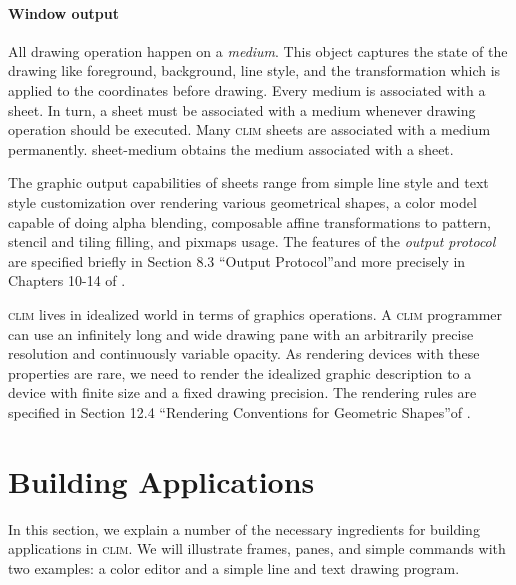 \documentclass[twocolumn,a4paper]{article}
\newcommand {\concept} [1] {{\sl #1}\index{#1}}
\newcommand {\code}[1]{{\sffamily #1}}
\newcommand {\CLIM}{\textsc{clim}}
\newcommand {\mcclim}{\textsc{McCLIM}}
\begin{document}
\paragraph*{Window output}

All drawing operation happen on a \concept{medium}. This object
captures the state of the drawing like foreground, background, line
style, and the transformation which is applied to the coordinates
before drawing. Every medium is associated with a sheet. In turn, a
sheet must be associated with a medium whenever drawing operation
should be executed. Many \CLIM{} sheets are associated with a medium
permanently. \code{sheet-medium} obtains the medium associated with a
sheet.

The graphic output capabilities of sheets range from simple line style
and text style customization over rendering various geometrical
shapes, a color model capable of doing alpha blending, composable
affine transformations to pattern, stencil and tiling filling, and
pixmaps usage. The features of the \concept{output protocol} are
specified briefly in Section 8.3 ``Output Protocol''and more precisely
in Chapters 10-14 of \cite{clim-spec}.

\CLIM{} lives in idealized world in terms of graphics operations. A
\CLIM{} programmer can use an infinitely long and wide drawing pane
with an arbitrarily precise resolution and continuously variable 
opacity. As rendering devices with these properties are rare,
we need to render the idealized graphic description to a device
with finite size and a fixed drawing precision. The rendering rules
are specified in Section 12.4 ``Rendering Conventions for Geometric
Shapes''of \cite{clim-spec}.

\section{Building Applications} 

In this section, we explain a number of the necessary ingredients for
building applications in \CLIM{}. We will illustrate frames, panes,
and simple commands with two examples: a color editor and a simple
line and text drawing program.
\end{document}
